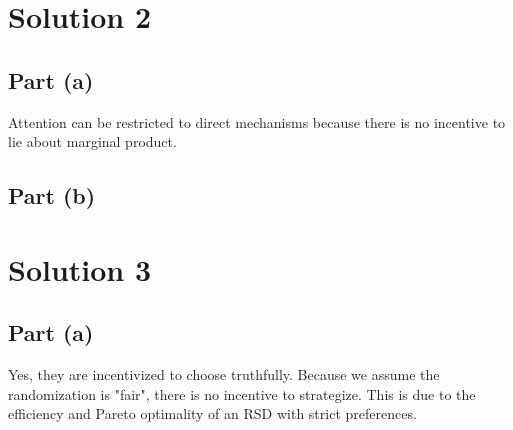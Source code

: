 \documentclass[10pt,a4paper]{article}
\begin{document}
\section*{Solution 2}
  \subsection*{Part (a)}
    Attention can be restricted to direct mechanisms because there is no incentive to lie about marginal product. 

  \subsection*{Part (b)}
    
\section*{Solution 3}
  \subsection*{Part (a)}
    Yes, they are incentivized to choose truthfully. Because we assume the randomization is "fair", there is no incentive to strategize. This is due to the efficiency and Pareto optimality of an RSD with strict preferences.
\end{document}
